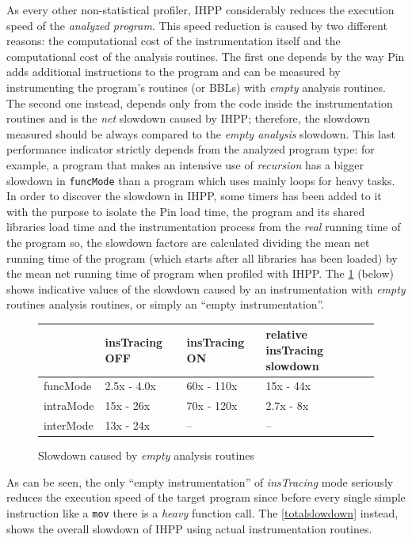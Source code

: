\documentclass[a4paper,10pt]{report}
\begin{document}
As every other non-statistical profiler, IHPP considerably reduces the execution 
speed of the \emph{analyzed program}. This speed reduction is caused by two different 
reasons: the computational cost of the instrumentation itself and the computational
cost of the analysis routines. The first one depends by the way Pin
adds additional instructions to the program and can be measured by 
instrumenting the program's routines (or BBLs) with \emph{empty} analysis routines.
The second one instead, depends only from the code inside the instrumentation routines
and is the \emph{net} slowdown caused by IHPP; therefore, the 
slowdown measured should be always compared to the \emph{empty analysis} slowdown.
This last performance indicator strictly depends from the analyzed program type: 
for example, a program that makes an intensive use 
of \emph{recursion} has a bigger slowdown in \verb|funcMode|  
than a program which uses mainly loops for heavy tasks.
In order to discover the slowdown in IHPP, 
some timers has been added to it with the purpose to isolate
the Pin load time, the program and its shared libraries load time 
and the instrumentation process from the \emph{real} running time of the program
so, the slowdown factors are calculated dividing the mean net running time 
of the program (which starts after all libraries has been loaded) by the mean
net running time of program when profiled with IHPP.
The \cref{emptyslowdown} (below) shows indicative values of the slowdown 
caused by an instrumentation with \emph{empty} routines analysis routines, 
or simply an ``empty instrumentation''.

\begin{figure}[H]

\centering

{\renewcommand{\arraystretch}{1.2}
\renewcommand{\tabcolsep}{0.2cm}
\begin{tabular}{l|l|l|l}
& insTracing OFF & insTracing ON & relative insTracing slowdown\\
\hline
funcMode & 2.5x - 4.0x & 60x - 110x & 15x - 44x\\
intraMode & 15x - 26x & 70x - 120x & 2.7x - 8x\\
interMode & 13x - 24x & -- & --\\
\end{tabular}}


\caption{Slowdown caused by \emph{empty} analysis routines}
\label{emptyslowdown}
\end{figure}

\noindent
As can be seen, the only ``empty instrumentation'' of \emph{insTracing} mode 
seriously reduces the execution speed of the target program since 
before every single simple instruction like a \verb|mov| there is a \emph{heavy}
function call. The \cref{totalslowdown} instead, shows the overall slowdown of IHPP
using actual instrumentation routines.
\end{document}
